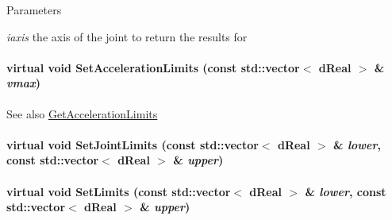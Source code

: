 \begin{DoxyParams}{Parameters}
\item[{\em iaxis}]the axis of the joint to return the results for \end{DoxyParams}
\hypertarget{classOpenRAVE_1_1KinBody_1_1Joint_a66a3b9657e5dfc13903c47664445fb93}{
\paragraph[{SetAccelerationLimits}]{\setlength{\rightskip}{0pt plus 5cm}virtual void SetAccelerationLimits (const std::vector$<$ dReal $>$ \& {\em vmax})}\hfill}
\label{classOpenRAVE_1_1KinBody_1_1Joint_a66a3b9657e5dfc13903c47664445fb93}
\begin{DoxySeeAlso}{See also}
\hyperlink{classOpenRAVE_1_1KinBody_1_1Joint_a1234a540b764968374f7454bda61b6e0}{GetAccelerationLimits} 
\end{DoxySeeAlso}
\hypertarget{classOpenRAVE_1_1KinBody_1_1Joint_a7f0e2be49eea7d168eab550af4f0ec97}{
\paragraph[{SetJointLimits}]{\setlength{\rightskip}{0pt plus 5cm}virtual void SetJointLimits (const std::vector$<$ dReal $>$ \& {\em lower}, \/  const std::vector$<$ dReal $>$ \& {\em upper})}\hfill}
\label{classOpenRAVE_1_1KinBody_1_1Joint_a7f0e2be49eea7d168eab550af4f0ec97}
\hypertarget{classOpenRAVE_1_1KinBody_1_1Joint_a90d56cf93256fd2c4087cd3bac140e66}{
\paragraph[{SetLimits}]{\setlength{\rightskip}{0pt plus 5cm}virtual void SetLimits (const std::vector$<$ dReal $>$ \& {\em lower}, \/  const std::vector$<$ dReal $>$ \& {\em upper})}\hfill}
